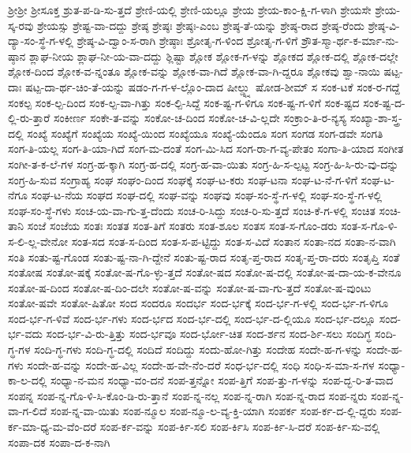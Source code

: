 {ಶ್ರೀಶ್ರೀ
ಶ್ರೀಸೂಕ್ತ
ಶ್ರುತ-ಪ-ಡಿ-ಸು-ತ್ತದೆ
ಶ್ರೇಣಿ-ಯಲ್ಲಿ
ಶ್ರೇಣಿ-ಯಲ್ಲೂ
ಶ್ರೇಯ
ಶ್ರೇಯ-ಕಾಂ-ಕ್ಷಿ-ಗ-ಳಾಗಿ
ಶ್ರೇಯಸೇ
ಶ್ರೇಯ-ಸ್ಕ-ರವು
ಶ್ರೇಯಸ್ಸು
ಶ್ರೇಷ್ಟ-ವಾ-ದದ್ದು
ಶ್ರೇಷ್ಠ
ಶ್ರೇಷ್ಠಃ
ಶ್ರೇಷ್ಠಃ-ಎಂಬ
ಶ್ರೇಷ್ಠ-ತೆ-ಯನ್ನು
ಶ್ರೇಷ್ಠ-ರಾದ
ಶ್ರೇಷ್ಠ-ರೆಂದು
ಶ್ರೇಷ್ಠ-ವಿ-ದ್ಯಾ-ಸಂ-ಸ್ಥೆ-ಗ-ಳಲ್ಲಿ
ಶ್ರೇಷ್ಠ-ವಿ-ದ್ವಾಂ-ಸ-ರಾಗಿ
ಶ್ರೇಷ್ಠಾಃ
ಶ್ರೋತೃ-ಗ-ಳಿಂದ
ಶ್ರೋತೃ-ಗ-ಳಿಗೆ
ಶ್ರೌತ-ಸ್ಮಾ-ರ್ಥ-ಕ-ರ್ಮಾ-ನು-ಷ್ಠಾನ
ಶ್ಲಾಘ-ನೀಯ
ಶ್ಲಾಘ-ನೀ-ಯ-ವಾ-ದದ್ದು
ಶ್ಲಿಷ್ಟಾ
ಶ್ಲೋಕ
ಶ್ಲೋಕ-ಗ-ಳನ್ನು
ಶ್ಲೋಕದ
ಶ್ಲೋಕ-ದಲ್ಲಿ
ಶ್ಲೋಕ-ದಲ್ಲೇ
ಶ್ಲೋಕ-ದಿಂದ
ಶ್ಲೋಕ-ವ-ನ್ನಂತೂ
ಶ್ಲೋಕ-ವನ್ನು
ಶ್ಲೋಕ-ವಾ-ಗಿದೆ
ಶ್ಲೋಕ-ವಾ-ಗಿ-ದ್ದರೂ
ಶ್ಲೋಕವು
ಶ್ವಾ-ನಾಯಿ
ಷಟ್ಪ-ದಾಃ
ಷಟ್ಪ-ದಾ-ರ್ಥ-ಚಿಂ-ತೆ-ಯನ್ನು
ಷಡಂ-ಗ-ಗ-ಳ-ಲ್ಲೊಂ-ದಾದ
ಷೀಲ್ಡ್ನ್ನು
ಷೋಡ-ಶೀಮ್
ಸ
ಸಂಕ-ಟಕೆ
ಸಂಕ-ರ-ಗದ್ದೆ
ಸಂಕಲ್ಪ
ಸಂಕ-ಲ್ಪ-ದಿಂದ
ಸಂಕ-ಲ್ಪ-ವಾ-ಗಿತ್ತು
ಸಂಕ-ಲ್ಪಿ-ಸಿದ್ದೆ
ಸಂಕ-ಷ್ಟ-ಗ-ಳಿಗೂ
ಸಂಕ-ಷ್ಟ-ಗ-ಳಿಗೆ
ಸಂಕ-ಷ್ಟದ
ಸಂಕ-ಷ್ಟ-ದ-ಲ್ಲಿ-ರು-ತ್ತಾರೆ
ಸಂಕೀರ್ಣ
ಸಂಕೇ-ತ-ವನ್ನು
ಸಂಕೋ-ಚ-ದಿಂದ
ಸಂಕೋ-ಚ-ವಿ-ಲ್ಲದೇ
ಸಂಕ್ರಾಂ-ತಿ-ರ-ನ್ಯಸ್ಯ
ಸಂಖ್ಯಾ-ಶಾ-ಸ್ತ್ರ-ದಲ್ಲಿ
ಸಂಖ್ಯೆ
ಸಂಖ್ಯೆಗೆ
ಸಂಖ್ಯೆಯ
ಸಂಖ್ಯೆ-ಯಿಂದ
ಸಂಖ್ಯೆಯೂ
ಸಂಖ್ಯೆ-ಯೆಂದೂ
ಸಂಗ
ಸಂಗಡ
ಸಂಗ-ಡವೇ
ಸಂಗತಿ
ಸಂಗ-ತಿ-ಯಲ್ಲ
ಸಂಗ-ತಿ-ಯಾ-ಗಿದೆ
ಸಂಗ-ಮ-ದಂತೆ
ಸಂಗ-ಮಿ-ಸಿದ
ಸಂಗ-ರಾ-ಗ-ವ್ಯ-ಪೇತಂ
ಸಂಗಾ-ತಿ-ಯಾದ
ಸಂಗೀತ
ಸಂಗೀ-ತ-ಕ-ಲೆ-ಗಳ
ಸಂಗ್ರ-ಹ-ಕ್ಕಾಗಿ
ಸಂಗ್ರ-ಹ-ದಲ್ಲಿ
ಸಂಗ್ರ-ಹ-ವಾ-ಯಿತು
ಸಂಗ್ರ-ಹಿ-ಸ-ಲ್ಪಟ್ಟ
ಸಂಗ್ರ-ಹಿ-ಸಿ-ರು-ವು-ದನ್ನು
ಸಂಗ್ರ-ಹಿ-ಸುವ
ಸಂಗ್ರಾಹ್ಯ
ಸಂಘ
ಸಂಘಂ-ದಿಂದ
ಸಂಘಕ್ಕೆ
ಸಂಘ-ಟ-ಕರು
ಸಂಘ-ಟನಾ
ಸಂಘ-ಟ-ನೆ-ಗ-ಳಿಗೆ
ಸಂಘ-ಟ-ನೆಗೂ
ಸಂಘ-ಟ-ನೆಯ
ಸಂಘದ
ಸಂಘ-ದಲ್ಲಿ
ಸಂಘ-ವನ್ನು
ಸಂಘವು
ಸಂಘ-ಸಂ-ಸ್ಥೆ-ಗ-ಳಲ್ಲಿ
ಸಂಘ-ಸಂ-ಸ್ಥೆ-ಗ-ಳಲ್ಲಿ
ಸಂಘ-ಸಂ-ಸ್ಥೆ-ಗಳು
ಸಂಚ-ಯ-ವಾ-ಗು-ತ್ತ-ದೆಂದು
ಸಂಚ-ರಿ-ಸಿದ್ದು
ಸಂಚ-ರಿ-ಸು-ತ್ತದೆ
ಸಂಚಿ-ಕೆ-ಗ-ಳಲ್ಲಿ
ಸಂಚಿತ
ಸಂಚಿ-ತಾನಿ
ಸಂಜೆ
ಸಂಜೆಯ
ಸಂತಃ
ಸಂತತ
ಸಂತ-ತಿಗೆ
ಸಂತರು
ಸಂತ-ಶೂಲ
ಸಂತಸ
ಸಂತ-ಸ-ಗೊಂ-ಡರು
ಸಂತ-ಸ-ಗೊ-ಳಿ-ಸ-ಲಿ-ಲ್ಲ-ವೇನೋ
ಸಂತ-ಸದ
ಸಂತ-ಸ-ದಿಂದ
ಸಂತ-ಸ-ಪ-ಟ್ಟಿದ್ದು
ಸಂತ-ಸ-ವಿದೆ
ಸಂತಾನ
ಸಂತಾ-ನದ
ಸಂತಾ-ನ-ವಾಗಿ
ಸಂತಿ
ಸಂತು-ಷ್ಟ-ಗೊಂಡ
ಸಂತು-ಷ್ಟ-ನಾ-ಗಿ-ದ್ದೇನೆ
ಸಂತು-ಷ್ಟ-ರಾದ
ಸಂತೃ-ಪ್ತ-ರಾದ
ಸಂತೃ-ಪ್ತ-ರಾ-ದರು
ಸಂತೃಪ್ತಿ
ಸಂತೆ
ಸಂತೋಷ
ಸಂತೋ-ಷಕ್ಕೆ
ಸಂತೋ-ಷ-ಗೊ-ಳ್ಳು-ತ್ತದೆ
ಸಂತೋ-ಷದ
ಸಂತೋ-ಷ-ದಲ್ಲಿ
ಸಂತೋ-ಷ-ದಾ-ಯ-ಕ-ವೇನೂ
ಸಂತೋ-ಷ-ದಿಂದ
ಸಂತೋ-ಷ-ದಿಂ-ದಲೇ
ಸಂತೋ-ಷ-ವನ್ನು
ಸಂತೋ-ಷ-ವಾ-ಗು-ತ್ತದೆ
ಸಂತೋ-ಷ-ವುಂಟು
ಸಂತೋ-ಷವೇ
ಸಂತೋ-ಷಿತೋ
ಸಂದ
ಸಂದರೂ
ಸಂದರ್ಭ
ಸಂದ-ರ್ಭಕ್ಕೆ
ಸಂದ-ರ್ಭ-ಗ-ಳಲ್ಲಿ
ಸಂದ-ರ್ಭ-ಗ-ಳಿಗೂ
ಸಂದ-ರ್ಭ-ಗ-ಳಿವೆ
ಸಂದ-ರ್ಭ-ಗಳು
ಸಂದ-ರ್ಭದ
ಸಂದ-ರ್ಭ-ದಲ್ಲಿ
ಸಂದ-ರ್ಭ-ದ-ಲ್ಲಿಯೂ
ಸಂದ-ರ್ಭ-ದಲ್ಲೂ
ಸಂದ-ರ್ಭ-ವದು
ಸಂದ-ರ್ಭ-ವಿ-ರು-ತ್ತಿತ್ತು
ಸಂದ-ರ್ಭವೂ
ಸಂದ-ರ್ಭೋ-ಚಿತ
ಸಂದ-ರ್ಶನ
ಸಂದ-ರ್ಶಿ-ಸಲು
ಸಂದಿಗ್ಧ
ಸಂದಿ-ಗ್ಧ-ಗಳ
ಸಂದಿ-ಗ್ಧ-ಗಳು
ಸಂದಿ-ಗ್ಧ-ದಲ್ಲಿ
ಸಂದಿದೆ
ಸಂದಿದ್ದು
ಸಂದು-ಹೋ-ಗಿತ್ತು
ಸಂದೇಹ
ಸಂದೇ-ಹ-ಗ-ಳನ್ನು
ಸಂದೇ-ಹ-ಗಳು
ಸಂದೇ-ಹ-ವನ್ನು
ಸಂದೇ-ಹ-ವಿಲ್ಲ
ಸಂದೇ-ಹ-ವೇ-ನೆಂ-ದರೆ
ಸಂಧ-ರ್ಭ-ದಲ್ಲಿ
ಸಂಧಿ
ಸಂಧಿ-ಸ-ಮಾ-ಸ-ಗಳ
ಸಂಧ್ಯಾ-ಕಾ-ಲ-ದಲ್ಲಿ
ಸಂಧ್ಯಾ-ನ-ಮನ
ಸಂಧ್ಯಾ-ವಂ-ದನೆ
ಸಂಪ-ತ್ತನ್ನೋ
ಸಂಪ-ತ್ತಿಗೆ
ಸಂಪ-ತ್ತು-ಗ-ಳನ್ನು
ಸಂಪ-ದ್ಭ-ರಿ-ತ-ವಾದ
ಸಂಪನ್ನ
ಸಂಪ-ನ್ನ-ಗೊ-ಳಿ-ಸಿ-ಕೊಂ-ಡಿ-ರು-ತ್ತಾನೆ
ಸಂಪ-ನ್ನ-ನಲ್ಲ
ಸಂಪ-ನ್ನ-ರಾಗಿ
ಸಂಪ-ನ್ನ-ರಾದ
ಸಂಪ-ನ್ನರು
ಸಂಪ-ನ್ನ-ವಾ-ಗ-ಲಿದೆ
ಸಂಪ-ನ್ನ-ವಾ-ಯಿತು
ಸಂಪ-ನ್ಮೂಲ
ಸಂಪ-ನ್ಮೂ-ಲ-ವ್ಯ-ಕ್ತಿ-ಯಾಗಿ
ಸಂಪರ್ಕ
ಸಂಪ-ರ್ಕ-ದ-ಲ್ಲಿ-ದ್ದರು
ಸಂಪ-ರ್ಕ-ಮಾ-ಧ್ಯ-ಮ-ವೆಂ-ದರೆ
ಸಂಪ-ರ್ಕ-ವನ್ನು
ಸಂಪ-ರ್ಕಿ-ಸಲಿ
ಸಂಪ-ರ್ಕಿಸಿ
ಸಂಪ-ರ್ಕಿ-ಸಿ-ದರೆ
ಸಂಪ-ರ್ಕಿ-ಸು-ವಲ್ಲಿ
ಸಂಪಾ-ದಕ
ಸಂಪಾ-ದ-ಕ-ನಾಗಿ
}
